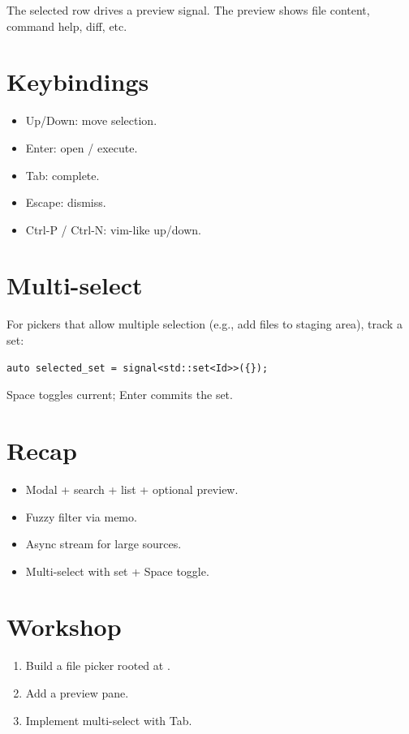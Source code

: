 The selected row drives a preview signal. The preview shows
file content, command help, diff, etc.

\section{Keybindings}

\begin{itemize}[leftmargin=*]
  \item Up/Down: move selection.
  \item Enter: open / execute.
  \item Tab: complete.
  \item Escape: dismiss.
  \item Ctrl-P / Ctrl-N: vim-like up/down.
\end{itemize}

\section{Multi-select}

For pickers that allow multiple selection (e.g., add files
to staging area), track a set:

\begin{lstlisting}
auto selected_set = signal<std::set<Id>>({});
\end{lstlisting}

Space toggles current; Enter commits the set.

\section{Recap}

\begin{recap}
\begin{itemize}[leftmargin=*]
  \item Modal + search + list + optional preview.
  \item Fuzzy filter via memo.
  \item Async stream for large sources.
  \item Multi-select with set + Space toggle.
\end{itemize}
\end{recap}

\section*{Workshop}

\begin{enumerate}[leftmargin=*]
  \item Build a file picker rooted at \code{\~/}.
  \item Add a preview pane.
  \item Implement multi-select with Tab.
\end{enumerate}

